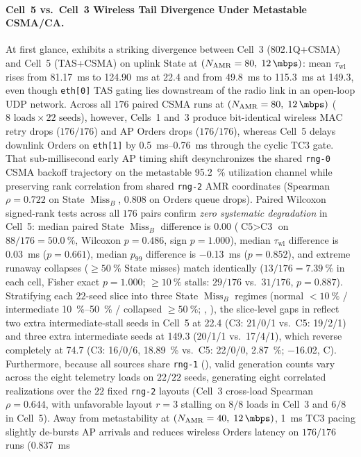 \documentclass[11pt,a4paper]{article}
\newcommand{\Namr}{\ensuremath{N_{\mathrm{AMR}}}}
\newcommand{\MissB}{\ensuremath{\operatorname{Miss}_B}}
\begin{document}
\paragraph{Cell~5 vs.\ Cell~3 Wireless Tail Divergence Under Metastable CSMA/CA.}
At first glance,  exhibits a striking divergence between Cell~3 (802.1Q+CSMA) and Cell~5 (TAS+CSMA) on uplink State at $(\Namr=80,\; \qty{12}{\mbps})$: mean $\tau_{\mathrm{wl}}$ rises from \qty{81.17}{\milli\second} to \qty{124.90}{\milli\second} at \qty{22.4}{\mbps} and from \qty{49.8}{\milli\second} to \qty{115.3}{\milli\second} at \qty{149.3}{\mbps}, even though \texttt{eth[0]} TAS gating lies downstream of the radio link in an open-loop UDP network. Across all $176$ paired CSMA runs at $(\Namr=80,\; \qty{12}{\mbps})$ ($8\text{ loads} \times 22\text{ seeds}$), however, Cells~1 and~3 produce bit-identical wireless MAC retry drops ($176/176$) and AP Orders drops ($176/176$), whereas Cell~5 delays downlink Orders on \texttt{eth[1]} by \qtyrange{0.5}{0.76}{\milli\second} through the cyclic TC3 gate. That sub-millisecond early AP timing shift desynchronizes the shared \texttt{rng-0} CSMA backoff trajectory on the metastable \qty{95.2}{\percent} utilization channel while preserving rank correlation from shared \texttt{rng-2} AMR coordinates (Spearman $\rho = 0.722$ on State $\MissB$, $0.808$ on Orders queue drops). Paired Wilcoxon signed-rank tests across all $176$ pairs confirm \emph{zero systematic degradation} in Cell~5: median paired State $\MissB$ difference is \qty{+0.00}{\pp} ($\text{C5} > \text{C3}$ on $88/176 = \qty{50.0}{\percent}$, Wilcoxon $p = 0.486$, sign $p = 1.000$), median $\tau_{\mathrm{wl}}$ difference is \qty{+0.03}{\milli\second} ($p = 0.661$), median $p_{99}$ difference is \qty{-0.13}{\milli\second} ($p = 0.852$), and extreme runaway collapses ($\ge \qty{50}{\percent}$ State misses) match identically ($13/176 = \qty{7.39}{\percent}$ in each cell, Fisher exact $p = 1.000$; $\ge \qty{10}{\percent}$ stalls: $29/176$ vs.\ $31/176$, $p = 0.887$). Stratifying each $22$-seed slice into three State $\MissB$ regimes (normal $< \qty{10}{\percent}$ / intermediate \qtyrange{10}{50}{\percent} / collapsed $\ge \qty{50}{\percent}$; , ), the slice-level gaps in  reflect two extra intermediate-stall seeds in Cell~5 at \qty{22.4}{\mbps} (C3: \num{21}/0/1 vs.\ C5: \num{19}/2/1) and three extra intermediate seeds at \qty{149.3}{\mbps} (\num{20}/1/1 vs.\ \num{17}/4/1), which reverse completely at \qty{74.7}{\mbps} (C3: \num{16}/0/6, \qty{18.89}{\percent} vs.\ C5: \num{22}/0/0, \qty{2.87}{\percent}; \qty{-16.02}{\pp}, C). Furthermore, because all sources share \texttt{rng-1} (), valid generation counts vary across the eight telemetry loads on $22/22$ seeds, generating eight correlated realizations over the $22$ fixed \texttt{rng-2} layouts (Cell~3 cross-load Spearman $\rho = 0.644$, with unfavorable layout $r=3$ stalling on $8/8$ loads in Cell~3 and $6/8$ in Cell~5). Away from metastability at $(\Namr=40,\; \qty{12}{\mbps})$, \qty{1}{\milli\second} TC3 pacing slightly de-bursts AP arrivals and reduces wireless Orders latency on $176/176$ runs (\qty{0.837}{\milli\second} 
\end{document}

